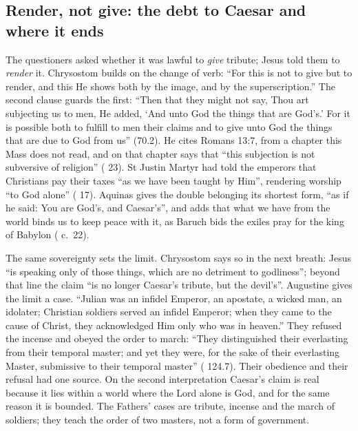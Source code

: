 \subsection{Render, not give: the debt to Caesar and where it ends}

The questioners asked whether it was lawful to \emph{give} tribute; Jesus told
them to \emph{render} it. Chrysostom builds on the change of verb: ``For this is
not to give but to render, and this He shows both by the image, and by the
superscription.'' The second clause guards the first: ``Then that they might
not say, Thou art subjecting us to men, He added, `And unto God the things that
are God's.' For it is possible both to fulfill to men their claims and to give
unto God the things that are due to God from us'' (70.2). He cites Romans 13:7,
from a chapter this Mass does not read, and on that chapter says that ``this
subjection is not subversive of religion'' ( 23). St
Justin Martyr had told the emperors that Christians pay their taxes ``as we have
been taught by Him'', rendering worship ``to God alone'' (
17). Aquinas gives the double belonging its shortest form, ``as if he said: You
are God's, and Caesar's'', and adds that what we have from the world binds us
to keep peace with it, as Baruch bids the exiles pray for the king of Babylon
( c.~22).

The same sovereignty sets the limit. Chrysostom says so in the next breath:
Jesus ``is speaking only of those things, which are no detriment to
godliness''; beyond that line the claim ``is no longer Caesar's tribute, but
the devil's''. Augustine gives the limit a case. ``Julian was an infidel
Emperor, an apostate, a wicked man, an idolater; Christian soldiers served an
infidel Emperor; when they came to the cause of Christ, they acknowledged Him
only who was in heaven.'' They refused the incense and obeyed the order to
march: ``They distinguished their everlasting from their temporal master; and
yet they were, for the sake of their everlasting Master, submissive to their
temporal master'' ( 124.7). Their obedience and
their refusal had one source. On the second interpretation Caesar's claim is
real because it lies within a world where the Lord alone is God, and for the
same reason it is bounded. The Fathers' cases are tribute, incense and the
march of soldiers; they teach the order of two masters, not a form of
government.

